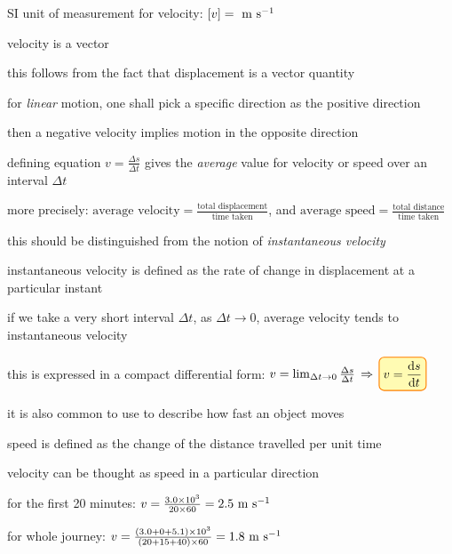 \cmt SI unit of measurement for velocity: $[v]= \text{ m s$^{-1}$}$

\cmt velocity is a vector

this follows from the fact that displacement is a vector quantity

\cmt for \emph{linear} motion, one shall pick a specific direction as the positive direction

then a negative velocity implies motion in the opposite direction

\cmt defining equation $v=\frac{\Delta s}{\Delta t}$ gives the \emph{average} value for velocity or speed over an interval $\Delta t$

more precisely: $\boxed{\text{average velocity} = \frac{\text{total displacement}}{\text{time taken}}}$, and $\boxed{\text{average speed} = \frac{\text{total distance}}{\text{time taken}}}$

\eqyskip this should be distinguished from the notion of \emph{instantaneous velocity}

instantaneous velocity is defined as the rate of change in displacement at a particular instant

if we take a very short interval $\Delta t$, as $\Delta t \to 0$, average velocity tends to instantaneous velocity

this is expressed in a compact differential form: $v = \lim_{\Delta t \to 0} \frac{\Delta s}{\Delta t} \ra \boxed{v=\frac{\dd s}{\dd t}} $


\newpage


\cmt it is also common to use  to describe how fast an object moves

speed is defined as the change of the distance travelled per unit time

velocity can be thought as speed in a particular direction




\sol for the first 20 minutes: $ v = \frac{3.0\times10^3}{20 \times 60} = 2.5 \text{ m s$^{-1}$}$

\eqyskip for whole journey: $v = \frac{(3.0+0+5.1)\times10^3}{(20+15+40)\times60} = 1.8 \text{ m s$^{-1}$} $ \eoe


